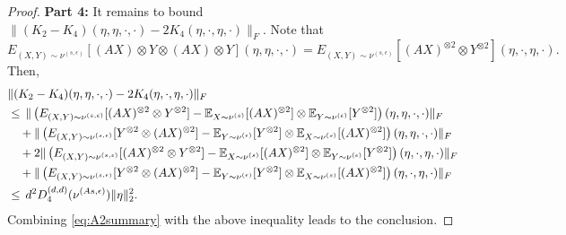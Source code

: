 \begin{proof}
	\vspace{5mm}
	{\bf Part 4:}
	It remains to bound $\|(K_2-K_4)(\eta,\eta,\cdot, \cdot) - 2K_4(\eta,\cdot,\eta,\cdot)\|_F$. 
	Note that $$E_{(X,Y)\sim \nu^{(s,\epsilon)}} [ (AX)\otimes Y\otimes (AX)\otimes Y](\eta,\eta,\cdot,\cdot)  = E_{(X,Y)\sim \nu^{(s,\epsilon)}} [ (AX)^{\otimes 2}\otimes Y^{\otimes 2}](\eta,\cdot,\eta,\cdot).$$
	Then,
	\begin{align*}
	& \|(K_2-K_4)(\eta,\eta,\cdot, \cdot) - 2K_4(\eta,\cdot,\eta,\cdot)\|_F \\
	& \le \,\|\left( E_{(X,Y)\sim \nu^{(s,\epsilon)}} [ (AX)^{\otimes 2}\otimes Y^{\otimes 2}]- \mathbb{E}_{X\sim \nu^{(s)}}[(AX)^{\otimes 2}] \otimes \mathbb{E}_{Y\sim \nu^{(\epsilon)}}[Y^{\otimes 2}]\right)(\eta,\eta,\cdot,\cdot)\|_F \\
	& \quad + \|\left( E_{(X,Y)\sim \nu^{(s,\epsilon)}} [ Y^{\otimes 2}\otimes (AX)^{\otimes 2}]- \mathbb{E}_{Y\sim \nu^{(\epsilon)}}[Y^{\otimes 2}] \otimes \mathbb{E}_{X\sim \nu^{(s)}}[(AX)^{\otimes 2}]\right)(\eta,\eta,\cdot,\cdot)\|_F \\
	& \quad + 2\|\left( E_{(X,Y)\sim \nu^{(s,\epsilon)}} [ (AX)^{\otimes 2}\otimes Y^{\otimes 2}]- \mathbb{E}_{X\sim \nu^{(s)}}[(AX)^{\otimes 2}] \otimes \mathbb{E}_{Y\sim \nu^{(\epsilon)}}[Y^{\otimes 2}]\right)(\eta,\cdot,\eta,\cdot)\|_F \\
	& \quad + \|\left( E_{(X,Y)\sim \nu^{(s,\epsilon)}} [ Y^{\otimes 2}\otimes (AX)^{\otimes 2}]- \mathbb{E}_{Y\sim \nu^{(\epsilon)}}[Y^{\otimes 2}] \otimes \mathbb{E}_{X\sim \nu^{(s)}}[(AX)^{\otimes 2}]\right)(\eta,\cdot,\eta, \cdot)\|_F \\
	& \le \,d^2D_4^{(d,d)}(\nu^{(As,\epsilon)})\|\eta\|^2_2. 
	\end{align*}
	Combining \cref{eq:A2summary} with the above inequality leads to the conclusion.
\end{proof}


